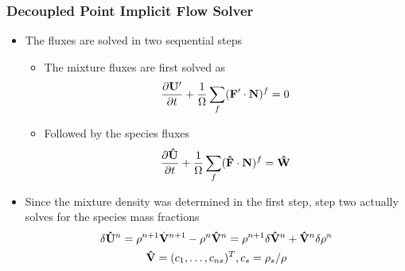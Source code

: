 \documentclass{beamer}
\begin{document}
\begin{frame}
  \frametitle{Decoupled Point Implicit Flow Solver}
  \begin{itemize}
    \item The fluxes are solved in two sequential steps
      \begin{itemize}
        \item  The mixture fluxes are first solved as
        \[
          \frac{\partial \mathbf U'}{\partial t} +
          \frac{1}{\Omega}\sum\limits_{f}(\mathbf F'\cdot\mathbf{N})^f = 0
        \]
      \item Followed by the species fluxes
      \[
        \frac{\partial \mathbf{\hat{U}}}{\partial t} +
        \frac{1}{\Omega}\sum\limits_{f}(\mathbf{\hat{F}}\cdot \mathbf{N})^f =
        \mathbf{\hat{W}}
      \]
    \end{itemize}
    \item Since the mixture density was determined in the first step, step two
      actually solves for the species mass fractions
      \begin{gather*}
        \delta \mathbf{\hat{U}}^n 
        = \rho^{n+1} \hat{\mathbf V}^{n+1}-\rho^n\mathbf{\hat{V}}^n = \rho^{n+1} \delta
        \mathbf{\hat{V}}^n + \mathbf{\hat{V}}^n \delta \rho^n \\
        \mathbf{\hat{V}}=(c_1,\hdots,c_{ns})^T, c_s=\rho_s/\rho
      \end{gather*}
  \end{itemize}
\end{frame}
\end{document}
